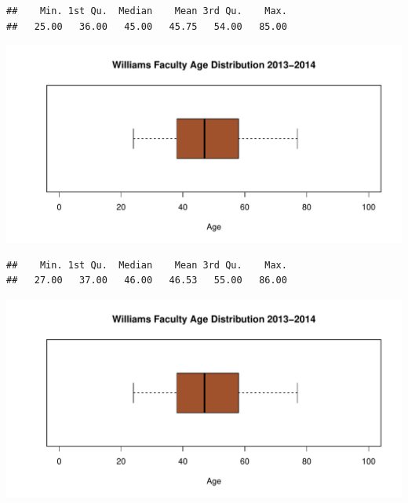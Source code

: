 \documentclass[12pt,a4paper]{article}\usepackage[]{graphicx}\usepackage[]{color}
\makeatletter
\def\maxwidth{ %
  \ifdim\Gin@nat@width>\linewidth
    \linewidth
  \else
    \Gin@nat@width
  \fi
}
\newenvironment{kframe}{%
 \def\at@end@of@kframe{}%
 \ifinner\ifhmode%
  \def\at@end@of@kframe{\end{minipage}}%
  \begin{minipage}{\columnwidth}%
 \fi\fi%
 \def\FrameCommand##1{\hskip\@totalleftmargin \hskip-\fboxsep
 \colorbox{shadecolor}{##1}\hskip-\fboxsep
     \hskip-\linewidth \hskip-\@totalleftmargin \hskip\columnwidth}%
 \MakeFramed {\advance\hsize-\width
   \@totalleftmargin\z@ \linewidth\hsize
   \@setminipage}}%
 {\par\unskip\endMakeFramed%
 \at@end@of@kframe}
\newenvironment{knitrout}{}{} %
\theoremstyle{definition}
\makeatother
\begin{document}
\begin{knitrout}
\color{fgcolor}\begin{kframe}
\begin{verbatim}
##    Min. 1st Qu.  Median    Mean 3rd Qu.    Max. 
##   25.00   36.00   45.00   45.75   54.00   85.00
\end{verbatim}
\end{kframe}
\end{knitrout}

\begin{knitrout}
\color{fgcolor}
\includegraphics[width=\maxwidth]{figure/unnamed-chunk-32-1} 

\end{knitrout}

\begin{knitrout}
\color{fgcolor}\begin{kframe}
\begin{verbatim}
##    Min. 1st Qu.  Median    Mean 3rd Qu.    Max. 
##   27.00   37.00   46.00   46.53   55.00   86.00
\end{verbatim}
\end{kframe}
\end{knitrout}


\begin{knitrout}
\color{fgcolor}
\includegraphics[width=\maxwidth]{figure/unnamed-chunk-34-1} 

\end{knitrout}
\end{document}
